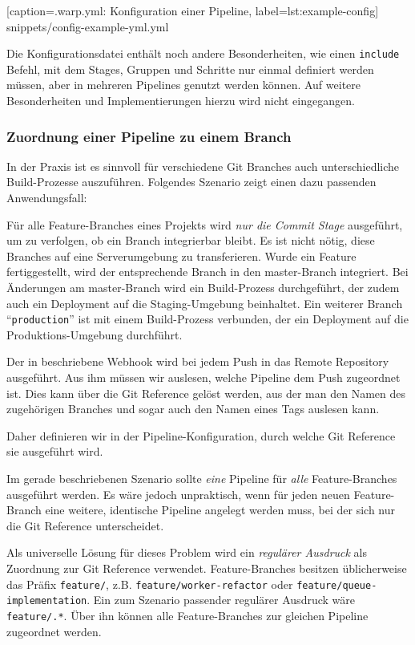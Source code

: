 
  [caption={.warp.yml: Konfiguration einer Pipeline},
  label={lst:example-config}]
  {snippets/config-example-yml.yml}

Die Konfigurationsdatei enthält noch andere Besonderheiten, wie einen \texttt{include} Befehl, mit dem Stages, Gruppen und Schritte nur einmal definiert werden müssen, aber in mehreren Pipelines genutzt werden können. Auf weitere Besonderheiten und Implementierungen hierzu wird nicht eingegangen.

\subsubsection{Zuordnung einer Pipeline zu einem Branch}
\label{subsec:git-reference}

In der Praxis ist es sinnvoll für verschiedene Git Branches auch unterschiedliche Build-Prozesse auszuführen. Folgendes Szenario zeigt einen dazu passenden Anwendungsfall:

Für alle Feature-Branches eines Projekts wird \emph{nur die Commit Stage} ausgeführt, um zu verfolgen, ob ein Branch integrierbar bleibt. Es ist nicht nötig, diese Branches auf eine Serverumgebung zu transferieren. Wurde ein Feature fertiggestellt, wird der entsprechende Branch in den master-Branch integriert. Bei Änderungen am master-Branch wird ein Build-Prozess durchgeführt, der zudem auch ein Deployment auf die Staging-Umgebung beinhaltet. Ein weiterer Branch ``\texttt{production}'' ist mit einem Build-Prozess verbunden, der ein Deployment auf die Produktions-Umgebung durchführt.

Der in  beschriebene Webhook wird bei jedem Push in das Remote Repository ausgeführt. Aus ihm müssen wir auslesen, welche Pipeline dem Push zugeordnet ist. Dies kann über die Git Reference gelöst werden, aus der man den Namen des zugehörigen Branches und sogar auch den Namen eines Tags auslesen kann.

Daher definieren wir in der Pipeline-Konfiguration, durch welche Git Reference sie ausgeführt wird.

Im gerade beschriebenen Szenario sollte \emph{eine} Pipeline für \emph{alle} Feature-Branches ausgeführt werden. Es wäre jedoch unpraktisch, wenn für jeden neuen Feature-Branch eine weitere, identische Pipeline angelegt werden muss, bei der sich nur die Git Reference unterscheidet.

Als universelle Lösung für dieses Problem wird ein \emph{regulärer Ausdruck} als Zuordnung zur Git Reference verwendet. Feature-Branches besitzen üblicherweise das Präfix \texttt{feature/}, z.B. \texttt{feature\allowbreak /worker\allowbreak -refactor} oder \texttt{feature/\allowbreak queue\allowbreak -imple\-men\-ta\-tion}. Ein zum Szenario passender regulärer Ausdruck wäre \texttt{feature/.*}. Über ihn können alle Feature-Branches zur gleichen Pipeline zugeordnet werden.

